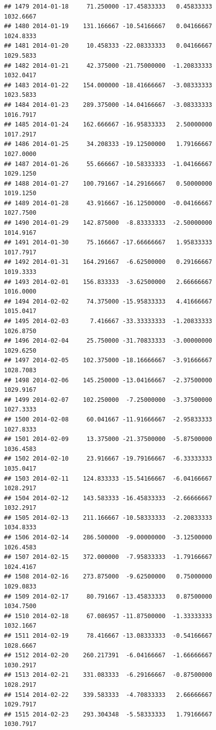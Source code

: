 \documentclass[
]{article}
\begin{document}
\begin{verbatim}
## 1479 2014-01-18     71.250000 -17.45833333   0.45833333    1032.6667
## 1480 2014-01-19    131.166667 -10.54166667   0.04166667    1024.8333
## 1481 2014-01-20     10.458333 -22.08333333   0.04166667    1029.5833
## 1482 2014-01-21     42.375000 -21.75000000  -1.20833333    1032.0417
## 1483 2014-01-22    154.000000 -18.41666667  -3.08333333    1023.5833
## 1484 2014-01-23    289.375000 -14.04166667  -3.08333333    1016.7917
## 1485 2014-01-24    162.666667 -16.95833333   2.50000000    1017.2917
## 1486 2014-01-25     34.208333 -19.12500000   1.79166667    1027.0000
## 1487 2014-01-26     55.666667 -10.58333333  -1.04166667    1029.1250
## 1488 2014-01-27    100.791667 -14.29166667   0.50000000    1019.1250
## 1489 2014-01-28     43.916667 -16.12500000  -0.04166667    1027.7500
## 1490 2014-01-29    142.875000  -8.83333333  -2.50000000    1014.9167
## 1491 2014-01-30     75.166667 -17.66666667   1.95833333    1017.7917
## 1492 2014-01-31    164.291667  -6.62500000   0.29166667    1019.3333
## 1493 2014-02-01    156.833333  -3.62500000   2.66666667    1016.0000
## 1494 2014-02-02     74.375000 -15.95833333   4.41666667    1015.0417
## 1495 2014-02-03      7.416667 -33.33333333  -1.20833333    1026.8750
## 1496 2014-02-04     25.750000 -31.70833333  -3.00000000    1029.6250
## 1497 2014-02-05    102.375000 -18.16666667  -3.91666667    1028.7083
## 1498 2014-02-06    145.250000 -13.04166667  -2.37500000    1029.9167
## 1499 2014-02-07    102.250000  -7.25000000  -3.37500000    1027.3333
## 1500 2014-02-08     60.041667 -11.91666667  -2.95833333    1027.8333
## 1501 2014-02-09     13.375000 -21.37500000  -5.87500000    1036.4583
## 1502 2014-02-10     23.916667 -19.79166667  -6.33333333    1035.0417
## 1503 2014-02-11    124.833333 -15.54166667  -6.04166667    1028.2917
## 1504 2014-02-12    143.583333 -16.45833333  -2.66666667    1032.2917
## 1505 2014-02-13    211.166667 -10.58333333  -2.20833333    1034.8333
## 1506 2014-02-14    286.500000  -9.00000000  -3.12500000    1026.4583
## 1507 2014-02-15    372.000000  -7.95833333  -1.79166667    1024.4167
## 1508 2014-02-16    273.875000  -9.62500000   0.75000000    1029.0833
## 1509 2014-02-17     80.791667 -13.45833333   0.87500000    1034.7500
## 1510 2014-02-18     67.086957 -11.87500000  -1.33333333    1032.1667
## 1511 2014-02-19     78.416667 -13.08333333  -0.54166667    1028.6667
## 1512 2014-02-20    260.217391  -6.04166667  -1.66666667    1030.2917
## 1513 2014-02-21    331.083333  -6.29166667  -0.87500000    1028.2917
## 1514 2014-02-22    339.583333  -4.70833333   2.66666667    1029.7917
## 1515 2014-02-23    293.304348  -5.58333333   1.79166667    1030.7917

\end{verbatim}
\end{document}

